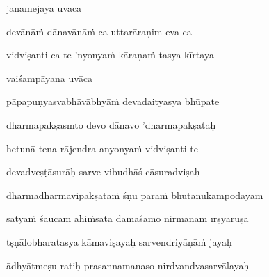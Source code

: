 \jump\jump
\vers

janamejaya uvāca~{\dandab}\dontdisplaylinenum 

devānā\.m dānavānā\.m ca uttarāraṇim eva ca\thinspace{\danda} \dontdisplaylinenum

vidviṣanti ca te 'nyonya\.m kāraṇa\.m tasya kīrtaya \veg\dontdisplaylinenum

vaiśampāyana uvāca~{\dandab}\dontdisplaylinenum 

pāpapuṇyasvabhāvābhyā\.m devadaityasya bhūpate\thinspace{\danda} \dontdisplaylinenum

dharmapakṣasmto devo dānavo 'dharmapakṣataḥ \veg\dontdisplaylinenum

hetunā tena rājendra anyonya\.m vidviṣanti te\thinspace{\dandab} \dontdisplaylinenum

devadveṣṭāsurāḥ sarve vibudhāś cāsuradviṣaḥ \veg\dontdisplaylinenum


\ujvers\nemsloka 
dharmādharmavipakṣatā\.m śṇu parā\.m bhūtānukampodayām
\dontdisplaylinenum

\nemslokab 
satya\.m śaucam ahi\.msatā damaśamo nirmānam īrṣyāruṣā \danda\dontdisplaylinenum

\nemslokac 
tṣṇālobharatasya kāmaviṣayaḥ sarvendriyāṇā\.m jayaḥ
\dontdisplaylinenum

\nemslokad 
ādhyātmeṣu ratiḥ prasannamanaso nirdvandvasarvālayaḥ \veg\dontdisplaylinenum

